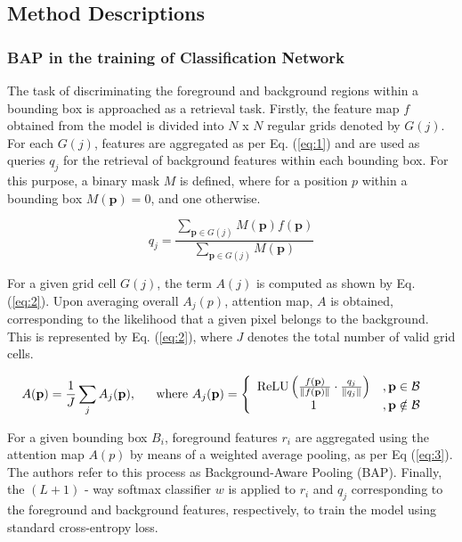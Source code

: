 \subsection{Method Descriptions}
\subsubsection{BAP in the training of Classification Network}
The task of discriminating the foreground and background regions within a bounding box is approached as a retrieval task. Firstly, the feature map $f$ obtained from the model is divided into $N$ x $N$ regular grids denoted by $G(j)$. For each $G(j)$, features are aggregated as per Eq. (\ref{eq:1}) and are used as queries $q_j$ for the retrieval of background features within each bounding box. For this purpose, a binary mask $M$ is defined, where for a position $p$ within a bounding box $M(\mathbf{p})=0$, and one otherwise.

\begin{equation} \label{eq:1}
q_{j}=\frac{\sum_{\mathbf{p} \in G(j)} M(\mathbf{p}) f(\mathbf{p})}{\sum_{\mathbf{p} \in G(j)} M(\mathbf{p})} 
\end{equation}

For a given grid cell $G(j)$, the term $A(j)$ is computed as shown by Eq. (\ref{eq:2}). Upon averaging overall $A_j(p)$, attention map, $A$ is obtained, corresponding to the likelihood that a given pixel belongs to the background. This is represented by Eq. (\ref{eq:2}), where $J$ denotes the total number of valid grid cells.

	\begin{align}
	\label{eq:2}
		A(\mathbf{p})=\frac{1}{J} \sum_{j} A_{j}(\mathbf{p}),
		& \text{\hspace{0.5cm} where } A_{j}(\mathbf{p})=\left\{\begin{array}{cl}
        \operatorname{ReLU}\left(\frac{f(\mathbf{p})}{\|f(\mathbf{p})\|} \cdot \frac{q_{j}}{\left\|q_{j}\right\|}\right) & , \mathbf{p} \in \mathcal{B} \\
        1 & , \mathbf{p} \notin \mathcal{B}
        \end{array}\right.
	\end{align}

For a given bounding box $B_i$, foreground features $r_i$ are aggregated using the attention map $A(p)$ by means of a weighted average pooling, as per Eq (\ref{eq:3}). The authors refer to this process as Background-Aware Pooling (BAP). Finally, the $(L+1)$ - way softmax classifier $w$ is applied to $r_i$ and $q_j$ corresponding to the foreground and background features, respectively, to train the model using standard cross-entropy loss.


